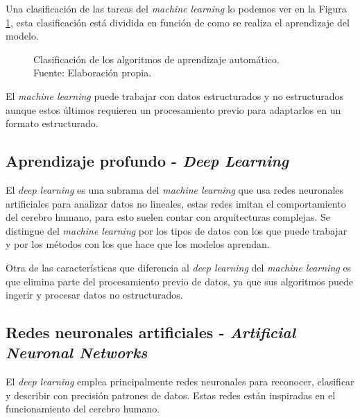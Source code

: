 Una clasificación de las tareas del \textit{machine learning} lo podemos ver en la Figura \ref{fig:machine-learning}, esta clasificación está dividida en función de como se realiza el aprendizaje del modelo.

\begin{figure}[H]
    \centering
    \centerline{}
    \caption{Clasificación de los algoritmos de aprendizaje automático.\\Fuente: Elaboración propia.}
    \label{fig:machine-learning}
\end{figure}

El \textit{machine learning} puede trabajar con datos estructurados y no estructurados aunque estos últimos requieren un procesamiento previo para adaptarlos en un formato estructurado.



\subsection{Aprendizaje profundo - \textit{Deep Learning}}

El \textit{deep learning} es una subrama del \textit{machine learning} que usa redes neuronales artificiales para analizar datos no lineales, estas redes imitan el comportamiento del cerebro humano, para esto suelen contar con arquitecturas complejas.
Se distingue del \textit{machine learning} por los tipos de datos con los que puede trabajar y por los métodos con los que hace que los modelos aprendan.

Otra de las características que diferencia al \textit{deep learning} del \textit{machine learning} es que elimina parte del procesamiento previo de datos, ya que sus algoritmos puede ingerir y procesar datos no estructurados.



\subsection{Redes neuronales artificiales - \textit{Artificial Neuronal Networks}}
El \textit{deep learning} emplea principalmente redes neuronales para reconocer, clasificar y describir con precisión patrones de datos. Estas redes están inspiradas en el funcionamiento del cerebro humano.  \cite{ibm-deep-learning}

